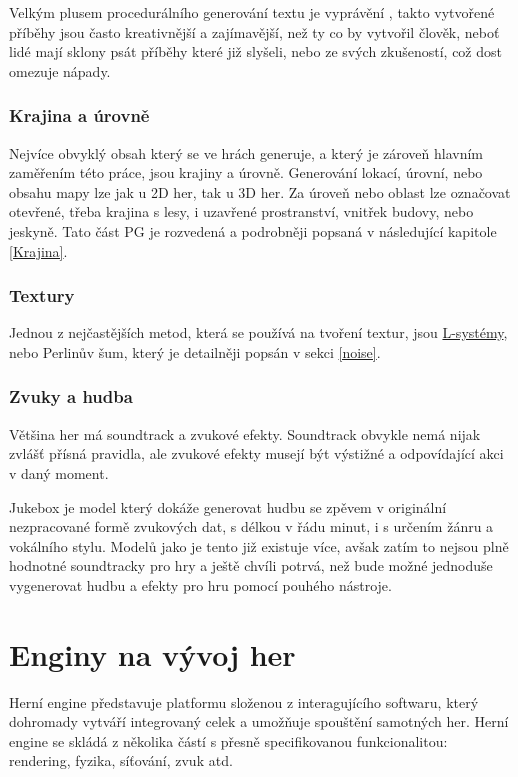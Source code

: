 Velkým plusem procedurálního generování textu je vyprávění \cite{madoc59000}, takto vytvořené příběhy jsou často kreativnější a zajímavější, než ty co by vytvořil člověk, neboť lidé mají sklony psát příběhy které již slyšeli, nebo ze svých zkušeností, což dost omezuje nápady.

\subsection{Krajina a úrovně}
Nejvíce obvyklý obsah který se ve hrách generuje, a který je zároveň hlavním zaměřením této práce, jsou krajiny a úrovně. Generování lokací, úrovní, nebo obsahu mapy lze jak u 2D her, tak u 3D her. Za úroveň nebo oblast lze označovat otevřené, třeba krajina s lesy, i uzavřené prostranství, vnitřek budovy, nebo jeskyně. Tato část PG je rozvedená a podrobněji popsaná v následující kapitole \ref{Krajina}.

\subsection{Textury}
Jednou z nejčastějších metod, která se používá na tvoření textur, jsou \hyperref[lsystems]{L-systémy}, nebo Perlinův šum, který je detailněji popsán v sekci \ref{noise}.

\subsection{Zvuky a hudba}
Většina her má soundtrack a zvukové efekty. Soundtrack obvykle nemá nijak zvlášť přísná pravidla, ale zvukové efekty musejí být výstižné a odpovídající akci v daný moment. 

Jukebox \cite{Dhariwal2020JukeboxAG} je model který dokáže generovat hudbu se zpěvem v originální nezpracované formě zvukových dat, s délkou v řádu minut, i s určením žánru a vokálního stylu. Modelů jako je tento již existuje více, avšak zatím to nejsou plně hodnotné soundtracky pro hry a ještě chvíli potrvá, než bude možné jednoduše vygenerovat hudbu a efekty pro hru pomocí pouhého nástroje.

\pagebreak

\chapter{Enginy na vývoj her}
\label{engines}
Herní engine představuje platformu složenou z interagujícího softwaru, který dohromady vytváří integrovaný celek a umožňuje spouštění samotných her. Herní engine se skládá z několika částí s přesně specifikovanou funkcionalitou: rendering, fyzika, síťování, zvuk atd.~\cite{nilson2007game} 

